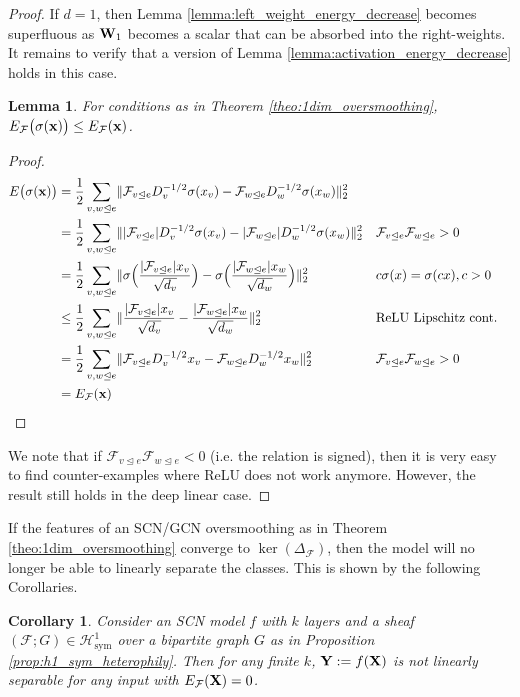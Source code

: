 \documentclass{article}
\newtheorem{lemma}[theorem]{Lemma}
\newtheorem{corollary}[theorem]{Corollary}
\def\vx{{\bf{x}}}
\def\mW{{\bf{W}}}
\def\mX{{\bf{X}}}
\def\mY{{\bf{Y}}}
\def\gF{{\mathcal{F}}}
\def\gH{{\mathcal{H}}}
\newcommand{\tleq}{\trianglelefteq}
\DeclarePairedDelimiter{\norm}{\lVert}{\rVert}
\begin{document}
\OneDimOversmoothing*
\begin{proof}
If $d=1$, then Lemma \ref{lemma:left_weight_energy_decrease} becomes superfluous as $\mW_1$ becomes a scalar that can be absorbed into the right-weights. It remains to verify that a version of Lemma \ref{lemma:activation_energy_decrease} holds in this case.

\begin{lemma}
For conditions as in Theorem \ref{theo:1dim_oversmoothing}, $E_\gF\big(\sigma(\vx)\big) \leq E_\gF(\vx)$.
\end{lemma}

\begin{proof}
\begin{align}
    E\big(\sigma(\vx)\big) &= \frac{1}{2} \sum_{v,w \tleq e} \norm{\gF_{v \tleq e} D_{v}^{-1/2}\sigma(x_{v}) - \gF_{w \tleq e} D_{w}^{-1/2}\sigma(x_{w})}_2^2 \\
    &= \frac{1}{2} \sum_{v,w \tleq e} \norm{|\gF_{v \tleq e}| D_{v}^{-1/2}\sigma(x_{v}) - |\gF_{w \tleq e}| D_{w}^{-1/2}\sigma(x_{w})}_2^2 && \gF_{v \tleq e} \gF_{w \tleq e} > 0 \\
    &= \frac{1}{2} \sum_{v,w \tleq e} \norm{\sigma\Big(\frac{|\gF_{v \tleq e}| x_{v}}{\sqrt{d_v}}\Big) - \sigma\Big(\frac{|\gF_{w \tleq e}| x_{w}}{\sqrt{d_w}}\Big) }_2^2 && c\sigma(x) = \sigma(cx), c > 0 \\
    &\leq \frac{1}{2} \sum_{v,w \tleq e} \norm{\frac{|\gF_{v \tleq e}| x_{v}}{\sqrt{d_v}} - \frac{|\gF_{w \tleq e}| x_{w}}{\sqrt{d_w}} }_2^2 && \text{ReLU Lipschitz cont.} \\
    &= \frac{1}{2} \sum_{v,w \tleq e} \norm{\gF_{v \tleq e} D_{v}^{-1/2}x_{v} - \gF_{w \tleq e} D_{w}^{-1/2}x_{w}}_2^2 && \gF_{v \tleq e} \gF_{w \tleq e} > 0   \\
    &= E_\gF(\vx)
\end{align}
\end{proof}
We note that if $\gF_{v \tleq e} \gF_{w \tleq e} < 0$ (i.e. the relation is signed), then it is very easy to find counter-examples where ReLU does not work anymore. However, the result still holds in the deep linear case. 
\end{proof}

If the features of an SCN/GCN oversmoothing as in Theorem \ref{theo:1dim_oversmoothing} converge to $\ker(\Delta_\gF)$, then the model will no longer be able to linearly separate the classes. This is shown by the following Corollaries. 


\begin{corollary}\label{cor:gcn_one}
Consider an SCN model $f$ with $k$ layers and a sheaf $(\gF; G) \in \gH^1_{\mathrm{sym}}$ over a bipartite graph $G$ as in Proposition \ref{prop:h1_sym_heterophily}. Then for any finite $k$, $\mY := f(\mX)$ is not linearly separable for any input with $E_\gF(\mX) = 0$.  
\end{corollary}
\end{document}

